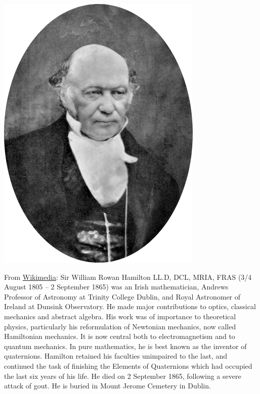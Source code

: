 \documentclass[../main.tex]{subfiles}
\begin{document}
\begin{marginfigure}
	\includegraphics[width=1\linewidth]{images/William_Rowan_Hamilton_portrait_oval_combined.png}
	\caption[Sir William Rowan Hamilton.]{From \href{https://commons.wikimedia.org/wiki/File:William_Rowan_Hamilton_portrait_oval_combined.png}{Wikimedia}: Sir William Rowan Hamilton LL.D, DCL, MRIA, FRAS (3/4 August 1805 – 2 September 1865) was an Irish mathematician, Andrews Professor of Astronomy at Trinity College Dublin, and Royal Astronomer of Ireland at Dunsink Observatory. He made major contributions to optics, classical mechanics and abstract algebra. His work was of importance to theoretical physics, particularly his reformulation of Newtonian mechanics, now called Hamiltonian mechanics. It is now central both to electromagnetism and to quantum mechanics. In pure mathematics, he is best known as the inventor of quaternions. Hamilton retained his faculties unimpaired to the last, and continued the task of finishing the Elements of Quaternions which had occupied the last six years of his life. He died on 2 September 1865, following a severe attack of gout. He is buried in Mount Jerome Cemetery in Dublin.}
\end{marginfigure}
\end{document}
